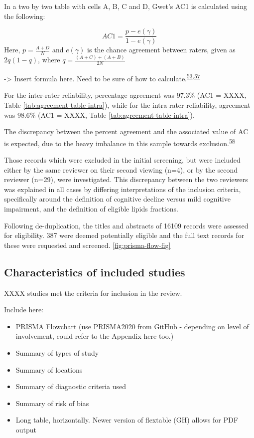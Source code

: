 \documentclass[a4paper, twoside]{templates/ociamthesis}
\begin{document}
In a two by two table with cells A, B, C and D, Gwet's AC1 is calculated using the following:

\[AC1 = \frac{p-e(\gamma)}{1-e(\gamma)}\] Here, \(p = \frac{A+D}{N}\) and \(e(\gamma)\) is the chance agreement between raters, given as \(2q(1-q)\), where \(q = \frac{(A+C)+(A+B)}{2N}\)

-\textgreater{} Insert formula here. Need to be sure of how to calculate.\textsuperscript{\protect\hyperlink{ref-gwet2008}{53},\protect\hyperlink{ref-sim2005}{57}}

For the inter-rater reliability, percentage agreement was 97.3\% (AC1 = XXXX, Table \ref{tab:agreement-table-intra}), while for the intra-rater reliability, agreement was 98.6\% (AC1 = XXXX, Table \ref{tab:agreement-table-intra}).

The discrepancy between the percent agreement and the associated value of AC is expected, due to the heavy imbalance in this sample towards exclusion.\textsuperscript{\protect\hyperlink{ref-feinstein1990}{58}}

Those records which were excluded in the initial screening, but were included either by the same reviewer on their second viewing (n=4), or by the second reviewer (n=29), were investigated. This discrepancy between the two reviewers was explained in all cases by differing interpretations of the inclusion criteria, specifically around the definition of cognitive decline versus mild cognitive impairment, and the definition of eligible lipids fractions.





Following de-duplication, the titles and abstracts of 16109 records were assessed for eligibility. 387 were deemed potentially eligible and the full text records for these were requested and screened. \ref{fig:prisma-flow-fig}

\hypertarget{characteristics-of-included-studies}{%
\subsection{Characteristics of included studies}\label{characteristics-of-included-studies}}

XXXX studies met the criteria for inclusion in the review.

Include here:

\begin{itemize}
\item
  PRISMA Flowchart (use PRISMA2020 from GitHub - depending on level of involvement, could refer to the Appendix here too.)
\item
  Summary of types of study
\item
  Summary of locations
\item
  Summary of diagnostic criteria used
\item
  Summary of risk of bias
\item
  Long table, horizontally. Newer version of flextable (GH) allows for PDF output
\end{itemize}
\end{document}
